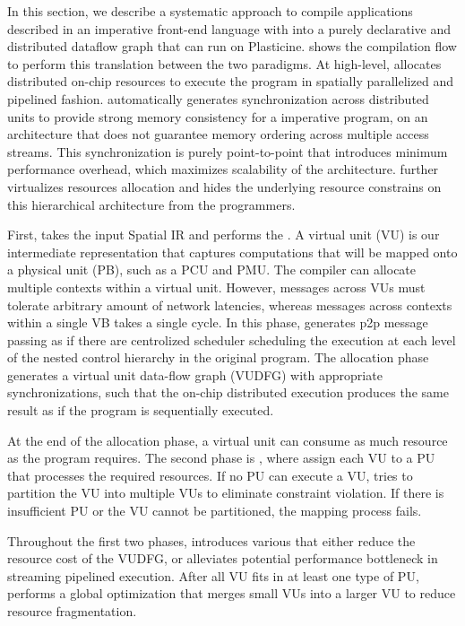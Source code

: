 In this section, we describe a systematic approach to compile applications described in an
imperative front-end language with into a purely declarative and distributed dataflow graph that can
run on Plasticine.
 shows the compilation flow to perform this translation between the two paradigms.
At high-level, \name allocates distributed on-chip resources to execute the program in spatially parallelized and
pipelined fashion.
\name automatically generates synchronization across distributed units to provide strong 
memory consistency for a imperative program, on an architecture that does not guarantee memory
ordering across multiple access streams.
This synchronization is purely point-to-point that introduces minimum performance overhead, which
maximizes scalability of the architecture.
\name further virtualizes resources allocation and hides the underlying resource constrains on
this hierarchical architecture from the programmers.

First, \name takes the input Spatial IR and performs the .
A virtual unit (VU) is our intermediate representation that captures computations that will be
mapped onto a physical unit (PB), such as a PCU and PMU.
The compiler can allocate multiple contexts within a virtual unit. However, messages across 
VUs must tolerate arbitrary amount of network latencies, whereas messages across contexts within a single VB
takes a single cycle.
In this phase, \name generates p2p message passing as if there are centrolized scheduler scheduling
the execution at each level of the nested control hierarchy in the original program.
The allocation phase generates a virtual unit data-flow graph (VUDFG) with appropriate
synchronizations, such that the on-chip distributed execution produces the same result as if the program is
sequentially executed.

At the end of the allocation phase, a virtual unit can consume as much resource as the program
requires. The second phase is , where \name assign each VU to a
PU that processes the required resources. If no PU can execute a VU, \name tries to partition the
VU into multiple VUs to eliminate constraint violation. If there is insufficient PU or the
VU cannot be partitioned, the mapping process fails.

Throughout the first two phases, \name introduces various  that either reduce the
resource cost of the VUDFG, or alleviates potential performance bottleneck in streaming pipelined execution.
After all VU fits in at least one type of PU, \name performs a global optimization that merges 
small VUs into a larger VU to reduce resource fragmentation.

